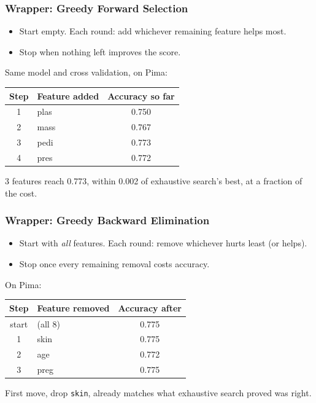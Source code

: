\begin{frame}[fragile]\frametitle{Wrapper: Greedy Forward Selection}
\begin{itemize}
\item Start empty. Each round: add whichever remaining feature helps most.
\item Stop when nothing left improves the score.
\end{itemize}

Same model and cross validation, on Pima:
\begin{center}
\small
\begin{tabular}{clc}
\textbf{Step} & \textbf{Feature added} & \textbf{Accuracy so far} \\ \hline
1 & plas & 0.750 \\
2 & mass & 0.767 \\
3 & pedi & 0.773 \\
4 & pres & 0.772 \\
\end{tabular}
\end{center}
3 features reach 0.773, within 0.002 of exhaustive search's best, at a fraction of the cost.
\end{frame}

\begin{frame}[fragile]\frametitle{Wrapper: Greedy Backward Elimination}
\begin{itemize}
\item Start with \emph{all} features. Each round: remove whichever hurts least (or helps).
\item Stop once every remaining removal costs accuracy.
\end{itemize}

On Pima:
\begin{center}
\small
\begin{tabular}{clc}
\textbf{Step} & \textbf{Feature removed} & \textbf{Accuracy after} \\ \hline
start & (all 8) & 0.775 \\
1 & skin & 0.775 \\
2 & age & 0.772 \\
3 & preg & 0.775 \\
\end{tabular}
\end{center}
First move, drop \texttt{skin}, already matches what exhaustive search proved was right.
\end{frame}

